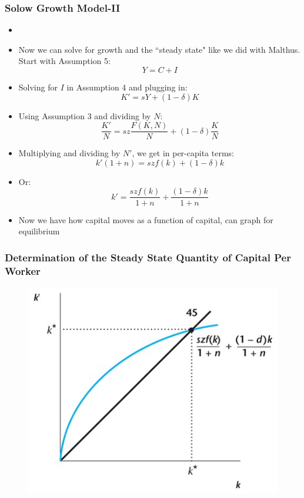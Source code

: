 \documentclass{beamer}
\begin{document}
\begin{frame}
\frametitle[alignment=center]{Solow Growth Model-II}
\begin{itemize}
\item \item Now we can solve for growth and the ``steady state" like we did with Malthus.  Start with Assumption 5: 
$$Y=C+I$$
\item Solving for $I$ in Assumption 4 and plugging in:
$$K'=sY+(1-\delta)K$$
\item Using Assumption 3 and dividing by $N$:
$$\frac{K'}{N}=sz\frac{F(K,N)}{N}+(1-\delta)\frac{K}{N}$$
\item Multiplying and dividing by $N'$, we get in per-capita terms:
$$k'(1+n)=szf(k)+(1-\delta)k$$
\item Or:
$$k'=\frac{szf(k)}{1+n}+\frac{(1-\delta)k}{1+n}$$
\item Now we have how capital moves as a function of capital, can graph for equilibrium
\end{itemize}
\end{frame}


\begin{frame}
\frametitle[alignment=center]{Determination of the Steady State Quantity of Capital Per Worker}
\begin{figure}
\centering
\includegraphics[scale=0.5]{Figures/W_Fig_7pt13.png}
\end{figure}
\end{frame}
\end{document}
